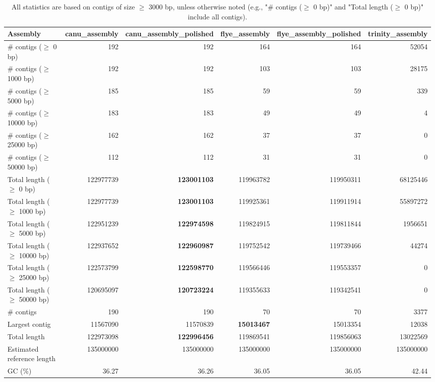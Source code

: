 \documentclass[12pt,a4paper]{article}
\begin{document}
\begin{table}[ht]
\begin{center}
\caption{All statistics are based on contigs of size $\geq$ 3000 bp, unless otherwise noted (e.g., "\# contigs ($\geq$ 0 bp)" and "Total length ($\geq$ 0 bp)" include all contigs).}
\begin{tabular}{|l*{5}{|r}|}
\hline
Assembly & canu\_assembly & canu\_assembly\_polished & flye\_assembly & flye\_assembly\_polished & trinity\_assembly \\ \hline
\# contigs ($\geq$ 0 bp) & 192 & 192 & 164 & 164 & 52054 \\ \hline
\# contigs ($\geq$ 1000 bp) & 192 & 192 & 103 & 103 & 28175 \\ \hline
\# contigs ($\geq$ 5000 bp) & 185 & 185 & 59 & 59 & 339 \\ \hline
\# contigs ($\geq$ 10000 bp) & 183 & 183 & 49 & 49 & 4 \\ \hline
\# contigs ($\geq$ 25000 bp) & 162 & 162 & 37 & 37 & 0 \\ \hline
\# contigs ($\geq$ 50000 bp) & 112 & 112 & 31 & 31 & 0 \\ \hline
Total length ($\geq$ 0 bp) & 122977739 & {\bf 123001103} & 119963782 & 119950311 & 68125446 \\ \hline
Total length ($\geq$ 1000 bp) & 122977739 & {\bf 123001103} & 119925361 & 119911914 & 55897272 \\ \hline
Total length ($\geq$ 5000 bp) & 122951239 & {\bf 122974598} & 119824915 & 119811844 & 1956651 \\ \hline
Total length ($\geq$ 10000 bp) & 122937652 & {\bf 122960987} & 119752542 & 119739466 & 44274 \\ \hline
Total length ($\geq$ 25000 bp) & 122573799 & {\bf 122598770} & 119566446 & 119553357 & 0 \\ \hline
Total length ($\geq$ 50000 bp) & 120695097 & {\bf 120723224} & 119355633 & 119342541 & 0 \\ \hline
\# contigs & 190 & 190 & 70 & 70 & 3377 \\ \hline
Largest contig & 11567090 & 11570839 & {\bf 15013467} & 15013354 & 12038 \\ \hline
Total length & 122973098 & {\bf 122996456} & 119869541 & 119856063 & 13022569 \\ \hline
Estimated reference length & 135000000 & 135000000 & 135000000 & 135000000 & 135000000 \\ \hline
GC (\%) & 36.27 & 36.26 & 36.05 & 36.05 & 42.44 \\ \hline

\end{tabular}
\end{center}
\end{table}
\end{document}
